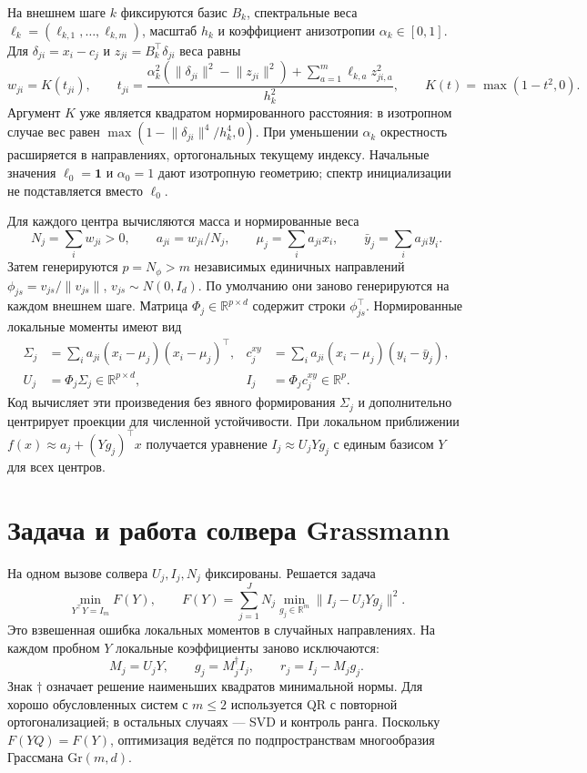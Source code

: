 \documentclass[11pt,a4paper]{article}
\newcommand{\R}{\mathbb R}
\newcommand{\norm}[1]{\lVert#1\rVert}
\begin{document}
На внешнем шаге $k$ фиксируются базис $B_k$, спектральные веса
$\ell_k=(\ell_{k,1},\ldots,\ell_{k,m})$, масштаб $h_k$
и коэффициент анизотропии $\alpha_k\in[0,1]$.
Для $\delta_{ji}=x_i-c_j$ и $z_{ji}=B_k^\top\delta_{ji}$ веса равны
\begin{equation}\label{eq:weights}
 w_{ji}=K(t_{ji}),\qquad
 t_{ji}=\frac{\alpha_k^2(\norm{\delta_{ji}}^2-\norm{z_{ji}}^2)
                  +\sum_{a=1}^m\ell_{k,a}z_{ji,a}^2}{h_k^2},
 \qquad K(t)=\max(1-t^2,0).
\end{equation}
Аргумент $K$ уже является квадратом нормированного расстояния:
в изотропном случае вес равен
$\max(1-\norm{\delta_{ji}}^4/h_k^4,0)$.
При уменьшении $\alpha_k$ окрестность расширяется в направлениях,
ортогональных текущему индексу. Начальные значения
$\ell_0=\bm 1$ и $\alpha_0=1$ дают изотропную геометрию;
спектр инициализации не подставляется вместо $\ell_0$.

Для каждого центра вычисляются масса и нормированные веса
\[
 N_j=\sum_iw_{ji}>0,\qquad a_{ji}=w_{ji}/N_j,\qquad
 \mu_j=\sum_i a_{ji}x_i,\qquad \bar y_j=\sum_i a_{ji}y_i.
\]
Затем генерируются $p=N_\phi>m$ независимых единичных направлений
$\phi_{js}=v_{js}/\norm{v_{js}}$, $v_{js}\sim N(0,I_d)$.
По умолчанию они заново генерируются на каждом внешнем шаге.
Матрица $\Phi_j\in\R^{p\times d}$ содержит строки $\phi_{js}^\top$.
Нормированные локальные моменты имеют вид
\begin{align}
 \Sigma_j&=\sum_i a_{ji}(x_i-\mu_j)(x_i-\mu_j)^\top,
 &c_j^{xy}&=\sum_i a_{ji}(x_i-\mu_j)(y_i-\bar y_j),\nonumber\\
 U_j&=\Phi_j\Sigma_j\in\R^{p\times d},
 &I_j&=\Phi_j c_j^{xy}\in\R^p.\label{eq:moments}
\end{align}
Код вычисляет эти произведения без явного формирования $\Sigma_j$
и дополнительно центрирует проекции для численной устойчивости.
При локальном приближении
$f(x)\approx a_j+(Yg_j)^\top x$ получается уравнение
$I_j\approx U_jYg_j$ с единым базисом $Y$ для всех центров.

\section{Задача и работа солвера Grassmann}

На одном вызове солвера $U_j,I_j,N_j$ фиксированы. Решается задача
\begin{equation}\label{eq:objective}
 \boxed{\quad
 \min_{Y^\top Y=I_m}F(Y),\qquad
 F(Y)=\sum_{j=1}^J N_j\min_{g_j\in\R^m}
                       \norm{I_j-U_jYg_j}^2.\quad}
\end{equation}
Это взвешенная ошибка локальных моментов в случайных направлениях.
На каждом пробном $Y$ локальные коэффициенты заново исключаются:
\[
 M_j=U_jY,\qquad g_j=M_j^\dagger I_j,
 \qquad r_j=I_j-M_jg_j.
\]
Знак $\dagger$ означает решение наименьших квадратов минимальной нормы.
Для хорошо обусловленных систем с $m\le2$ используется QR с повторной
ортогонализацией; в остальных случаях --- SVD и контроль ранга.
Поскольку $F(YQ)=F(Y)$, оптимизация ведётся по подпространствам
многообразия Грассмана $\mathrm{Gr}(m,d)$.
\end{document}
